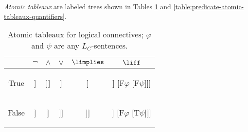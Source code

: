 \emph{Atomic tableaux} are labeled trees shown in Tables \ref{table:predicate-atomic-tableaux-logical} and \ref{table:predicate-atomic-tableaux-quantifiers}.

\begin{table}[htbp]
\centering
\begin{tabular}{@{}c||c|c|c|c|c@{}}
 & $\neg$ & $\land$ & $\lor$ & $\limplies$ & $\liff$  \\ \midrule \midrule
True
&  
\begin{forest}
[$\mathrm{T}\neg\varphi$ [$\mathrm{F}\varphi$]]
\end{forest}
&  
\begin{forest}
[$\mathrm{T}\varphi\land\psi$ [$\mathrm{T}\varphi$ [$\mathrm{T}\psi$]]]
\end{forest}
& 
\begin{forest}
[$\mathrm{T}\varphi\lor\psi$ [$\mathrm{T}\varphi$] [$\mathrm{T}\psi$]]
\end{forest}
&
\begin{forest}
[$\mathrm{T}\varphi\limplies\psi$ [$\mathrm{F}\varphi$] [$\mathrm{T}\psi$]]
\end{forest}
&  
\begin{forest}
[$\mathrm{T}\varphi\liff\psi$ [$\mathrm{T}\varphi$ [$\mathrm{T}\psi$]] [$\mathrm{F}\varphi$ [$\mathrm{F}\psi$]]]
\end{forest}
\\ \midrule
False 
& 
\begin{forest}
[$\mathrm{F}\neg\varphi$ [$\mathrm{T}\varphi$]]
\end{forest}
&
\begin{forest}
[$\mathrm{F}\varphi\land\psi$ [$\mathrm{F}\varphi$] [$\mathrm{F}\psi$]]
\end{forest}
&
\begin{forest}
[$\mathrm{F}\varphi\lor\psi$ [$\mathrm{F}\varphi$ [$\mathrm{F}\psi$]]]
\end{forest}
&
\begin{forest}
[$\mathrm{F}\varphi\limplies\psi$ [$\mathrm{T}\varphi$ [$\mathrm{F}\psi$]]]
\end{forest}
&
\begin{forest}
[$\mathrm{F}\varphi\liff\psi$ [$\mathrm{T}\varphi$ [$\mathrm{F}\psi$]] [$\mathrm{F}\varphi$ [$\mathrm{T}\psi$]]]
\end{forest}
\end{tabular}
\caption{Atomic tableaux for logical connectives; $\varphi$ and $\psi$ are any $L_C$-sentences.}
\label{table:predicate-atomic-tableaux-logical}
\end{table}


